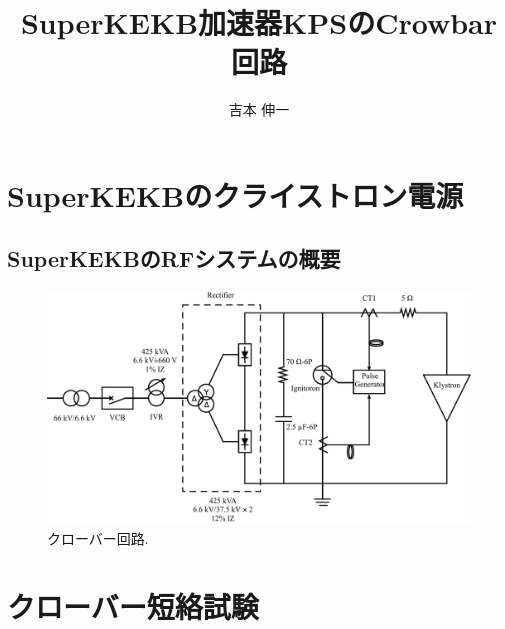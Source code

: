 \documentclass[book,openany]{jlreq}
\theoremstyle{definition}
\begin{document}
\title{SuperKEKB加速器KPSのCrowbar回路}
\author{吉本 伸一}
\maketitle
\tableofcontents

\chapter{SuperKEKBのクライストロン電源}
\section{SuperKEKBのRFシステムの概要}

%
\begin{figure}[htbp]
  \begin{center}
    \includegraphics[width=12cm]{figs/Crowbar_Circuit.pdf}
    \caption{クローバー回路.}
    \label{fig:CrowbarCircuit}
  \end{center}
\end{figure}

\chapter{クローバー短絡試験}
\end{document}
